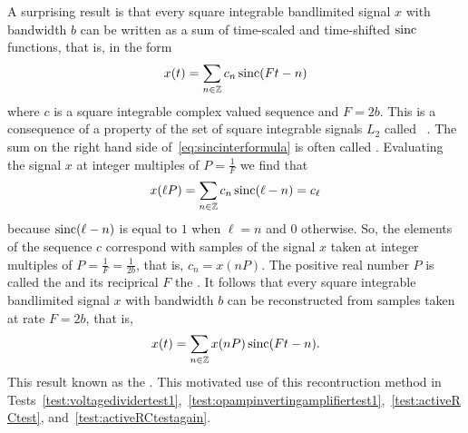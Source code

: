 A surprising result is that every square integrable bandlimited signal $x$ with bandwidth $b$ can be written as a sum of time-scaled and time-shifted $\operatorname{sinc}$ functions, that is, in the form
\begin{equation}\label{eq:sincinterformula}
 x(t) = \sum_{n \in {\mathbb Z}} c_n \operatorname{sinc}(F t - n)
 \end{equation}
where $c$ is a square integrable complex valued sequence and $F = 2b$.  This is a consequence of a property of the set of square integrable signals $L_2$ called ~\cite[Theorem~3.11 and page~91]{Rudin_real_and_complex_analysis}.  The sum on the right hand side of~\eqref{eq:sincinterformula} is often called .  %
Evaluating the signal $x$ at integer multiples of $P = \tfrac{1}{F}$ we find that
\[
x(\ell P) = \sum_{n \in {\mathbb Z}} c_n \operatorname{sinc}( \ell - n ) = c_\ell
\]
because $\operatorname{sinc}( \ell - n)$ is equal to $1$ when $\ell = n$ and $0$ otherwise.  So, the elements of the sequence $c$ correspond with samples of the signal $x$ taken at integer multiples of $P = \tfrac{1}{F} = \tfrac{1}{2b}$, that is, $c_n = x(nP)$.  The positive real number $P$ is called the  and its reciprical $F$ the .  It follows that every square integrable bandlimited signal $x$ with bandwidth $b$ can be reconstructed from samples taken at rate $F = 2b$, that is,
\[
x(t) = \sum_{n \in {\mathbb Z}} x( n P ) \operatorname{sinc}(F t - n).
\]
This result known as the .  %
This motivated use of this recontruction method in Tests~\ref{test:voltagedividertest1},~\ref{test:opampinvertingamplifiertest1},~\ref{test:activeRCtest}, and~\ref{test:activeRCtestagain}.

